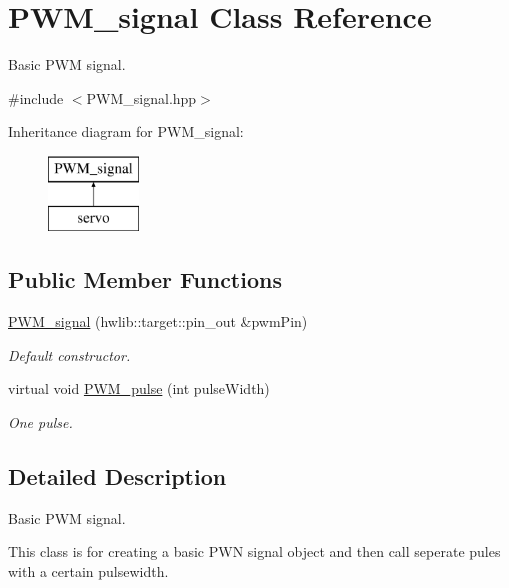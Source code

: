 \hypertarget{class_p_w_m__signal}{}\section{P\+W\+M\+\_\+signal Class Reference}
\label{class_p_w_m__signal}


Basic P\+WM signal.  




{\ttfamily \#include $<$P\+W\+M\+\_\+signal.\+hpp$>$}

Inheritance diagram for P\+W\+M\+\_\+signal\+:\begin{figure}[H]
\begin{center}
\leavevmode
\includegraphics[height=2.000000cm]{class_p_w_m__signal}
\end{center}
\end{figure}
\subsection*{Public Member Functions}
\begin{DoxyCompactItemize}
\item 
\hyperlink{class_p_w_m__signal_ad64aad0e6fe9cf246715bc9cf0f78247}{P\+W\+M\+\_\+signal} (hwlib\+::target\+::pin\+\_\+out \&pwm\+Pin)
\begin{DoxyCompactList}\small\item\em Default constructor. \end{DoxyCompactList}\item 
virtual void \hyperlink{class_p_w_m__signal_a82a9e4648b24a15992b59918e640157c}{P\+W\+M\+\_\+pulse} (int pulse\+Width)
\begin{DoxyCompactList}\small\item\em One pulse. \end{DoxyCompactList}\end{DoxyCompactItemize}


\subsection{Detailed Description}
Basic P\+WM signal. 

This class is for creating a basic P\+WN signal object and then call seperate pules with a certain pulsewidth. 

